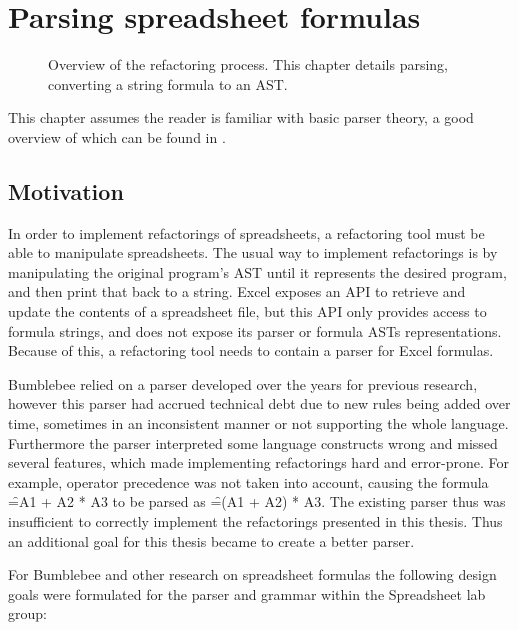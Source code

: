 
\chapter{Parsing spreadsheet formulas}
\label{chapter:parsing}

\noindent
\begin{figure}[h]
\centerfloat

\caption{Overview of the refactoring process. This chapter details parsing, converting a string formula to an AST.}
\end{figure}


\noindent
This chapter assumes the reader is familiar with basic parser theory, a good overview of which can be found in \cite{dragonbook}.

\section{Motivation}
\label{sec:motivation}

In order to implement refactorings of spreadsheets, a refactoring tool must be able to manipulate spreadsheets.
The usual way to implement refactorings is by manipulating the original program's AST until it represents the desired program, and then print that back to a string.
Excel exposes an API to retrieve and update the contents of a spreadsheet file, but this API only provides access to formula strings, and does not expose its parser or formula ASTs representations.
Because of this, a refactoring tool needs to contain a parser for Excel formulas.

Bumblebee relied on a parser developed over the years for previous research, however this parser had accrued technical debt due to new rules being added over time, sometimes in an inconsistent manner or not supporting the whole language.
Furthermore the parser interpreted some language constructs wrong and missed several features, which made implementing refactorings hard and error-prone.
For example, operator precedence was not taken into account, causing the formula \f{=A1 + A2 * A3} to be parsed as \f{=(A1 + A2) * A3}.
The existing parser thus was insufficient to correctly implement the refactorings presented in this thesis.
Thus an additional goal for this thesis became to create a better parser.

For Bumblebee and other research on spreadsheet formulas the following design goals were formulated for the parser and grammar within the Spreadsheet lab group:

